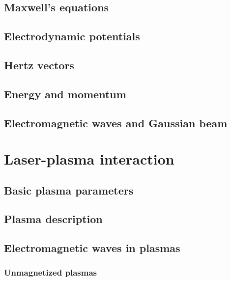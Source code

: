 \documentclass[12pt, twoside, a4paper, openright]{report}
\begin{document}
\section{Maxwell's equations}


\section{Electrodynamic potentials}


\section{Hertz vectors}


\section{Energy and momentum}


\section{Electromagnetic waves and Gaussian beam}



\chapter{Laser-plasma interaction}


\section{Basic plasma parameters}


\section{Plasma description}


\section{Electromagnetic waves in plasmas}


\subsection{Unmagnetized plasmas}

\end{document}
